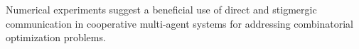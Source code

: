 Numerical experiments suggest a beneficial use of direct and
stigmergic communication in cooperative multi-agent systems for
addressing combinatorial optimization problems.





\begin{comment}
\begin{algorithm}
{\small \vspace{2 mm} Stigmergic Agent System}


{\small \hspace{4 mm} Set parameters}

{\small  \hspace{4 mm} Initialize pheromone trails} 

{\small \hspace{4 mm}  Initialize knowledge base}

{\small  \hspace{4 mm} Loop}

{\small  \hspace{8 mm} Activate a set of agents}

{\small   \hspace{8 mm} Each agent is positioned in the search space}

{\small   \hspace{8 mm} Loop}

{\small  \hspace{12 mm} Each agent applies a state transition rule to incrementally build a solution}

{\small  \hspace{12 mm} Next move is pro-actively determined based on stigmergic strategy or direct} 

{\small \hspace{12 mm} communication}

{\small  \hspace{12 mm} A local pheromone updating rule is applied}

{\small  \hspace{12 mm} Propagate learned knowledge to the other agents}

{\small  \hspace{8 mm} Until all agents have built a complete solution}

{\small \hspace{8 mm}  A global pheromone updating rule is applied}

{\small  \hspace{8 mm} Update knowledge base (using learned knowledge)}

{\small  \hspace{4 mm} Until endCondition}

endAlgorithm
\end{algorithm}
\end{comment}

